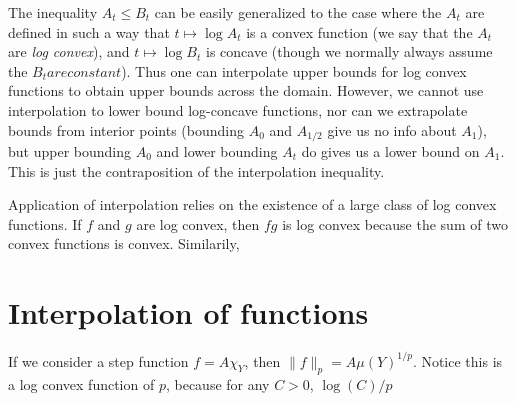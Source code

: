 The inequality $A_t \leq B_t$ can be easily generalized to the case where the $A_t$ are defined in such a way that $t \mapsto \log A_t$ is a convex function (we say that the $A_t$ are {\it log convex}), and $t \mapsto \log B_t$ is concave (though we normally always assume the $B_t are constant$). Thus one can interpolate upper bounds for log convex functions to obtain upper bounds across the domain. However, we cannot use interpolation to lower bound log-concave functions, nor can we extrapolate bounds from interior points (bounding $A_0$ and $A_{1/2}$ give us no info about $A_1$), but upper bounding $A_0$ and lower bounding $A_t$ do gives us a lower bound on $A_1$. This is just the contraposition of the interpolation inequality.

Application of interpolation relies on the existence of a large class of log convex functions. If $f$ and $g$ are log convex, then $fg$ is log convex because the sum of two convex functions is convex. Similarily, 

\section{Interpolation of functions}

If we consider a step function $f = A \chi_Y$, then $\| f \|_p = A \mu(Y)^{1/p}$. Notice this is a log convex function of $p$, because for any $C > 0$, $\log(C)/p$

